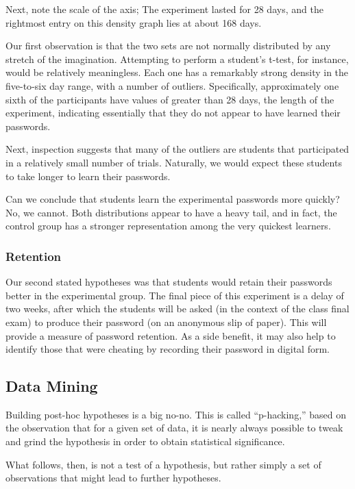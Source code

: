 \documentclass[preprint]{soups}
\let\SOriginalthesubsubsection\thesubsubsection
\newcommand{\Ssubsection}[2]{\subsection[#1]{#2}\let\thesubsubsection\SOriginalthesubsubsection}
\newcommand{\Ssubsubsection}[2]{\subsubsection[#1]{#2}}
\begin{document}
Next, note the scale of the  axis; The experiment lasted for
28 days, and the rightmost entry on this density graph lies at about 168
days.

Our first observation is that the two sets are not normally distributed
by any stretch of the imagination. Attempting to perform a student{'}s
t{-}test, for instance, would be relatively meaningless. Each one has
a remarkably strong density in the five{-}to{-}six day range, with a number
of outliers.
Specifically, approximately one sixth of the participants have values
of  greater than 28 days, the length of the experiment,
indicating essentially that they do not
appear to have learned their passwords.

Next, inspection suggests that many of the outliers are students that
participated in a relatively small number of trials. Naturally, we
would expect these students to take longer to learn their passwords.

Can we conclude that students learn the experimental passwords more
quickly? No, we cannot. Both distributions appear to have a heavy
tail, and in fact, the control group has a stronger representation
among the very quickest learners.

\Ssubsubsection{Retention}{Retention}\label{t:x28part_x22Retentionx22x29}

Our second stated hypotheses was that students would retain their
passwords better in the experimental group. The final piece of this
experiment is a delay of two weeks, after which the students will
be asked (in the context of the class final exam) to produce their
password (on an anonymous slip of paper). This will provide a measure
of password retention. As a side benefit, it may also help to identify
those that were cheating by recording their password in digital form.

\Ssubsection{Data Mining}{Data Mining}\label{t:x28part_x22Datax5fMiningx22x29}

Building post{-}hoc hypotheses is a big no{-}no. This is called {``}p{-}hacking,{''}
based on the observation that for a given set of data, it is nearly
always possible to tweak and grind the hypothesis in order to obtain
statistical significance.

What follows, then, is not a test of a hypothesis, but rather simply
a set of observations that might lead to further hypotheses.
\end{document}
